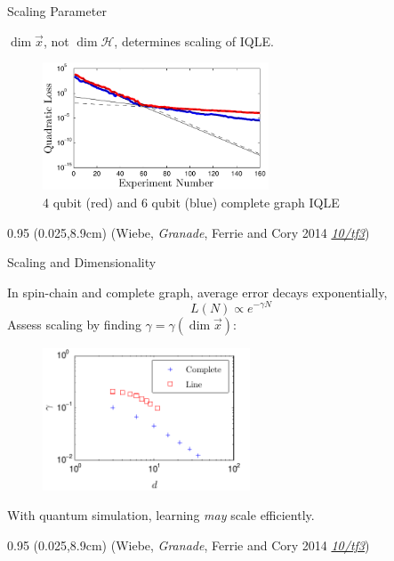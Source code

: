 \documentclass[xcolor=dvipsnames, compress]{beamer}
\renewcommand\UrlFont{\color{red}\rmfamily\itshape}
\newcommand{\shortdoi}[1]{\href{http://doi.org/#1}{\UrlFont 10/#1}}
\newcommand{\Hil}{\mathcal{H}}
\newcommand{\bottomnote}[1]{
  \begin{textblock*}{0.95\paperwidth} (0.025\paperwidth,8.9cm)
    {\tiny \hfill #1}
  \end{textblock*}
}
\begin{document}
\begin{frame}{Scaling Parameter}

  \begin{block}{}
     $\dim \vec{x}$, not $\dim \Hil$, determines scaling of IQLE.
  \end{block}

  \begin{figure}
    \centering
    \includegraphics[width=0.6\textwidth]{figures/corner}
    \caption{4 qubit (red) and 6 qubit (blue) complete graph IQLE}
  \end{figure}

  \bottomnote{(Wiebe, \emph{Granade}, Ferrie and Cory 2014 \shortdoi{tf3})}

\end{frame}

\begin{frame}{Scaling and Dimensionality}

    In spin-chain and complete graph, average error decays exponentially,
    \[
      L(N) \propto e^{-\gamma N}
    \]
    \pause
    Assess scaling by finding $\gamma = \gamma(\dim\vec{x})$:
    \begin{figure}
      \includegraphics[width=0.55\textwidth]{figures/exp_scale}
    \end{figure}
    \vspace{-1.5em}
    With quantum simulation, learning \emph{may} scale efficiently.

  \bottomnote{(Wiebe, \emph{Granade}, Ferrie and Cory 2014 \shortdoi{tf3})}

\end{frame}
\end{document}
